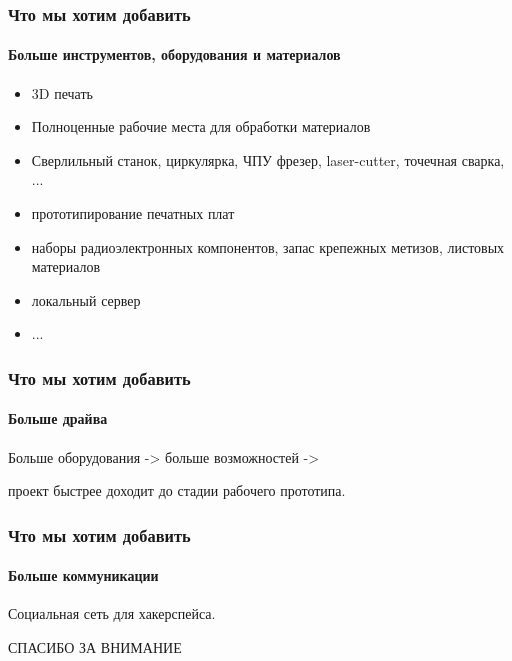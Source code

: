 \documentclass{beamer}
\newif\ifplacelogo %
\begin{document}
\begin {frame}
\frametitle {Что мы хотим добавить}
\framesubtitle {Больше инструментов, оборудования и материалов}
\begin{itemize}
\item 3D печать
\item Полноценные рабочие места для обработки материалов
\item Сверлильный станок, циркулярка, ЧПУ фрезер, laser-cutter, точечная сварка, ...
\item прототипирование печатных плат
\item наборы радиоэлектронных компонентов, запас крепежных метизов, листовых материалов
\item локальный сервер
\item ...
\end{itemize}
\end {frame}


\begin {frame}
\frametitle {Что мы хотим добавить}
\framesubtitle {Больше драйва}
Больше оборудования -> больше возможностей -> 

проект быстрее доходит до стадии рабочего прототипа.
\end {frame}


\begin {frame}
\frametitle {Что мы хотим добавить}
\framesubtitle {Больше коммуникации}
Социальная сеть для хакерспейса.
\end {frame}


\placelogofalse

\begin {frame}
\begin{center}
СПАСИБО ЗА ВНИМАНИЕ
\end{center}
\end {frame}
\end{document}

